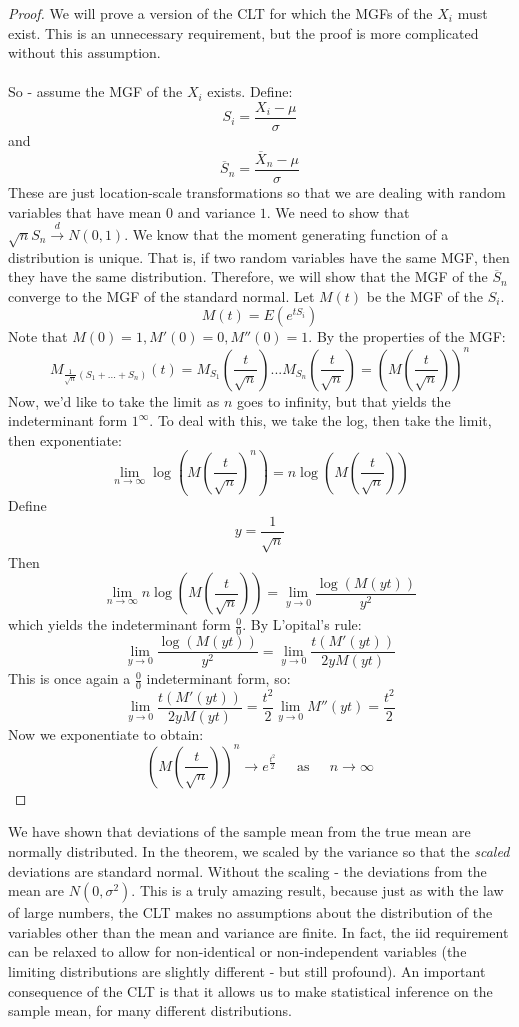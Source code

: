 \documentclass[12pt]{article} %
\begin{document}
\begin{proof}
We will prove a version of the CLT for which the MGFs of the $X_i$ must exist. This is an unnecessary requirement, but the proof is more complicated without this assumption.\\\\
So - assume the MGF of the $X_i$ exists. Define:
$$S_i = \frac{X_i-\mu}{\sigma}$$
and
$$\overline{S}_n = \frac{\overline{X}_n-\mu}{\sigma}$$
These are just location-scale transformations so that we are dealing with random variables that have mean $0$ and variance $1$. We need to show that $\sqrt{n}S_n\xrightarrow{d} N(0,1)$. We know that the moment generating function of a distribution is unique. That is, if two random variables have the same MGF, then they have the same distribution. Therefore, we will show that the MGF of the $\overline{S}_n$ converge to the MGF of the standard normal. Let $M(t)$ be the MGF of the $S_i$.
$$M(t) = E(e^{tS_i})$$
Note that $M(0)=1,M'(0)=0,M''(0) =1.$ By the properties of the MGF:
$$M_{\frac{1}{\sqrt{n}}\left(S_1+...+S_n\right)}(t) = M_{S_1}\left(\frac{t}{\sqrt{n}}\right)...M_{S_n}\left(\frac{t}{\sqrt{n}}\right) = \left(M\left(\frac{t}{\sqrt{n}}\right)\right)^n$$ 
Now, we'd like to take the limit as $n$ goes to infinity, but that yields the indeterminant form $1^\infty$. To deal with this, we take the log, then take the limit, then exponentiate:
$$\lim_{n\rightarrow\infty} \log\left(M\left(\frac{t}{\sqrt{n}}\right)^n\right) = n\log\left(M\left(\frac{t}{\sqrt{n}}\right)\right)$$
Define
$$y=\frac{1}{\sqrt{n}}$$
Then
$$\lim_{n\rightarrow\infty}n\log\left(M\left(\frac{t}{\sqrt{n}}\right)\right) = \lim_{y\rightarrow 0} \frac{\log(M(yt))}{y^2}$$
which yields the indeterminant form $\frac{0}{0}$. By L'opital's rule:
$$ \lim_{y\rightarrow 0} \frac{\log(M(yt))}{y^2} =  \lim_{y\rightarrow 0} \frac{t(M'(yt))}{2y M(yt)}$$
This is once again a $\frac{0}{0}$ indeterminant form, so:
$$\lim_{y\rightarrow 0} \frac{t(M'(yt))}{2y M(yt)} = \frac{t^2}{2}\lim_{y\rightarrow 0}M''(yt) = \frac{t^2}{2}$$
Now we exponentiate to obtain:
$$\left(M\left(\frac{t}{\sqrt{n}}\right)\right)^n\rightarrow e^{\frac{t^2}{2}} \;\;\;\;\textrm{ as }\;\;\;\; n\rightarrow \infty$$
\end{proof}
We have shown that deviations of the sample mean from the true mean are normally distributed. In the theorem, we scaled by the variance so that the \emph{scaled} deviations are standard normal. Without the scaling - the deviations from the mean are $N(0,\sigma^2)$. This is a truly amazing result, because just as with the law of large numbers, the CLT makes no assumptions about the distribution of the variables other than the mean and variance are finite. In fact, the iid requirement can be relaxed to allow for non-identical or non-independent variables (the limiting distributions are slightly different - but still profound). An important consequence of the CLT is that it allows us to make statistical inference on the sample mean, for many different distributions.  
\end{document}
